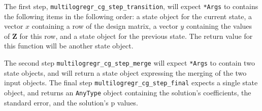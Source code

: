 \documentclass[12pt]{article}
\newcommand{\bS}[1] {\boldsymbol  #1}
\begin{document}
The first step, \texttt{multilogregr\_cg\_step\_transition}, will expect \texttt{*Args} to contains the following items in the following order: a state object for the current state, a vector $x$ containing a row of the design matrix, a vector $y$ containing the values of $\bS{Z}$ for this row, and a state object for the previous state.  The return value for this function will be another state object.  

The second step \texttt{multilogregr\_cg\_step\_merge} will expect \texttt{*Args} to contain two state objects, and will return a state object expressing the merging of the two input objects.  The final step \texttt{multilogregr\_cg\_step\_final} expects a single state object, and returns an \texttt{AnyType} object containing the solution's coefficients, the standard error, and the solution's p values.   




\end{document}
